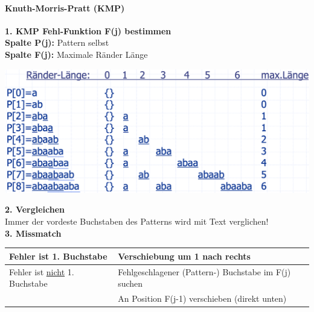 \paragraph{Knuth-Morris-Pratt (KMP)}
\textbf{1. KMP Fehl-Funktion F(j) bestimmen}\\

\textbf{Spalte P(j):} Pattern selbst\\
\textbf{Spalte F(j):} Maximale Ränder Länge
\begin{center}
    \includegraphics[scale=.2]{graphic/08 PatternMatching/KMP Fehl3.png}
\end{center}

\textbf{2. Vergleichen}\\
Immer der vordeste Buchstaben des Patterns wird mit Text verglichen!\\

\textbf{3. Missmatch}
\begin{center}
    \begin{tabular}[]{p{2cm} p{4cm}}
        Fehler ist 1. Buchstabe        & Verschiebung um 1 nach rechts\\
        \hline
         Fehler ist \underline{nicht} 1. Buchstabe & Fehlgeschlagener (Pattern-) Buchstabe im F(j) suchen\\
                & An Position F(j-1) verschieben (direkt unten) 
    \end{tabular}
\end{center}

\vfill
$ $

\newpage